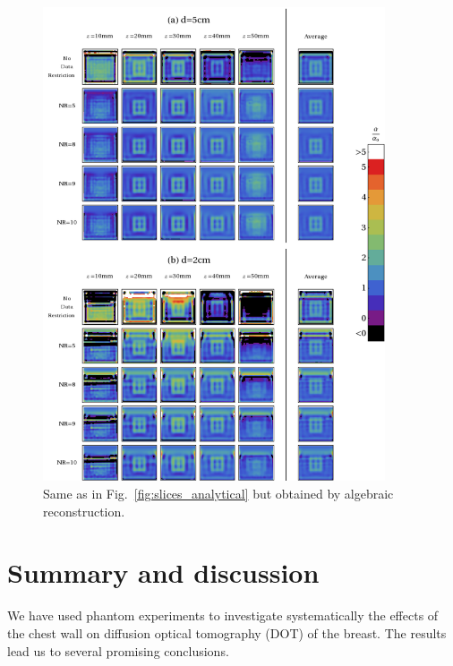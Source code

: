 \begin{figure}[htbp]
\begin{center}
\begin{minipage}[h]{1\textwidth}
\begin{center}
\includegraphics[width=0.9\textwidth]{./figures/chestwall_6.pdf}
\end{center}
\end{minipage}
\end{center}
\caption{\label{fig:slices_numerical}
  Same as in Fig.~\ref{fig:slices_analytical} but obtained by
  algebraic reconstruction. }
\end{figure}

\section{Summary and discussion}
\label{sec:sum}

We have used phantom experiments to investigate systematically the effects of the chest wall on diffusion optical tomography (DOT) of the breast.  The results lead us to several promising conclusions. 

